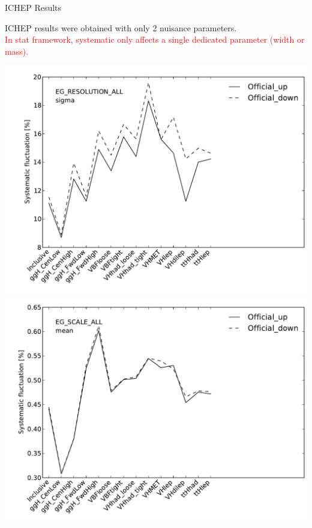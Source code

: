 \begin{frame}{ICHEP Results}
  \begin{minipage}{0.59\linewidth}
    ICHEP results were obtained with only 2 nuisance parameters.\\
    \textcolor{red}{In stat framework, systematic only affects a single dedicated parameter (width or mass).}\\
    
    \vfill
  \end{minipage}
  \begin{minipage}{0.4\linewidth}
    \includegraphics[width=\linewidth]{plots/Backup/h013_ICHEP_PhotonSyst_EG_RESOLUTION_ALL_sigma.pdf}\\
    \includegraphics[width=\linewidth]{plots/Backup/h013_ICHEP_PhotonSyst_EG_SCALE_ALL_mean.pdf}\\
  \end{minipage}
\end{frame}

